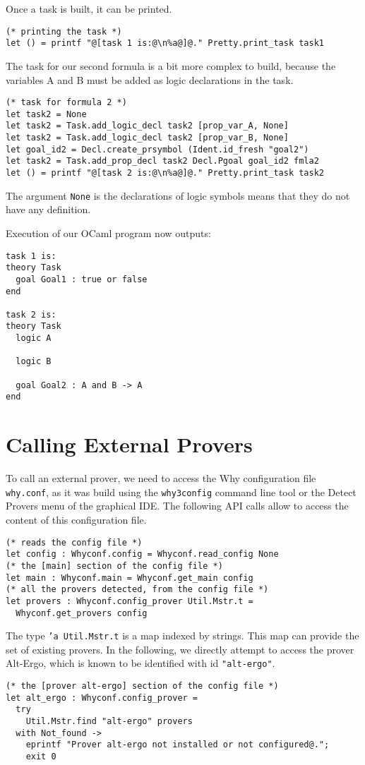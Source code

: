 Once a task is built, it can be printed.
\begin{verbatim}
(* printing the task *)
let () = printf "@[task 1 is:@\n%a@]@." Pretty.print_task task1
\end{verbatim}

The task for our second formula is a bit more complex to build, because
the variables A and B must be added as logic declarations in the task.
\begin{verbatim}
(* task for formula 2 *)
let task2 = None
let task2 = Task.add_logic_decl task2 [prop_var_A, None]
let task2 = Task.add_logic_decl task2 [prop_var_B, None]
let goal_id2 = Decl.create_prsymbol (Ident.id_fresh "goal2")
let task2 = Task.add_prop_decl task2 Decl.Pgoal goal_id2 fmla2
let () = printf "@[task 2 is:@\n%a@]@." Pretty.print_task task2
\end{verbatim}
The argument \texttt{None} is the declarations of logic symbols means
that they do not have any definition.

Execution of our OCaml program now outputs:
\begin{verbatim}
task 1 is:
theory Task
  goal Goal1 : true or false
end

task 2 is:
theory Task
  logic A

  logic B

  goal Goal2 : A and B -> A
end
\end{verbatim}

\section{Calling External Provers}

To call an external prover, we need to access the Why configuration
file \texttt{why.conf}, as it was build using the \texttt{why3config}
command line tool or the \textsf{Detect Provers} menu of the graphical
IDE. The following API calls allow to access the content of this
configuration file.
\begin{verbatim}
(* reads the config file *)
let config : Whyconf.config = Whyconf.read_config None
(* the [main] section of the config file *)
let main : Whyconf.main = Whyconf.get_main config
(* all the provers detected, from the config file *)
let provers : Whyconf.config_prover Util.Mstr.t =
  Whyconf.get_provers config
\end{verbatim}
The type \texttt{'a Util.Mstr.t} is a map indexed by strings. This map
can provide the set of existing provers. In the following, we directly
attempt to access the prover Alt-Ergo, which is known to be identified
with id \texttt{"alt-ergo"}.
\begin{verbatim}
(* the [prover alt-ergo] section of the config file *)
let alt_ergo : Whyconf.config_prover =
  try
    Util.Mstr.find "alt-ergo" provers
  with Not_found ->
    eprintf "Prover alt-ergo not installed or not configured@.";
    exit 0
\end{verbatim}

